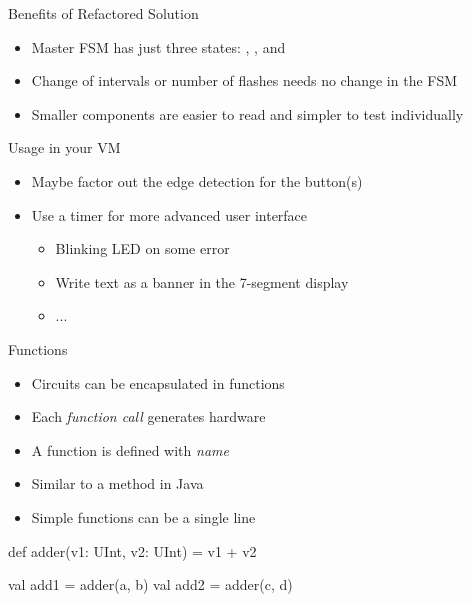 
\begin{frame}[fragile]{Benefits of Refactored Solution}
\begin{itemize}
\item Master FSM has just three states: , , and 
\item Change of intervals or number of flashes needs no change in the FSM
\item Smaller components are easier to read and simpler to test individually
\end{itemize}
\end{frame}

\begin{frame}[fragile]{Usage in your VM}
\begin{itemize}
\item Maybe factor out the edge detection for the button(s)
\item Use a timer for more advanced user interface
\begin{itemize}
\item Blinking LED on some error
\item Write text as a banner in the 7-segment display
\item ...
\end{itemize}
\end{itemize}
\end{frame}

\begin{frame}[fragile]{Functions}
\begin{itemize}
\item Circuits can be encapsulated in functions
\item Each \emph{function call} generates hardware
\item A function is defined with  \emph{name}
\item Similar to a method in Java
\item Simple functions can be a single line
\end{itemize}
\begin{chisel}
  def adder(v1: UInt, v2: UInt) = v1 + v2
  
  val add1 = adder(a, b)
  val add2 = adder(c, d)
\end{chisel}
\end{frame}


